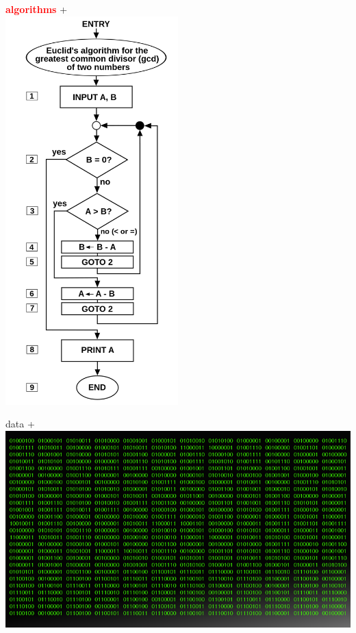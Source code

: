 \documentclass[12pt]{beamer}
\begin{document}
\begin{frame}
\begin{minipage}[t]{0.2\textwidth}
\end{minipage} 
\begin{minipage}[t]{0.2\textwidth}
\centering
\textbf{\textcolor{red}{algorithms}} + 
\\
\includegraphics[width=0.5\textwidth]{Figures/algorithm.png} 
\end{minipage} 
\begin{minipage}[t]{0.2\textwidth}
\centering
data + 
\\\vskip 0.2cm
\includegraphics[width=\textwidth]{Figures/data.png} 

\end{minipage}
\end{frame}
\end{document}
